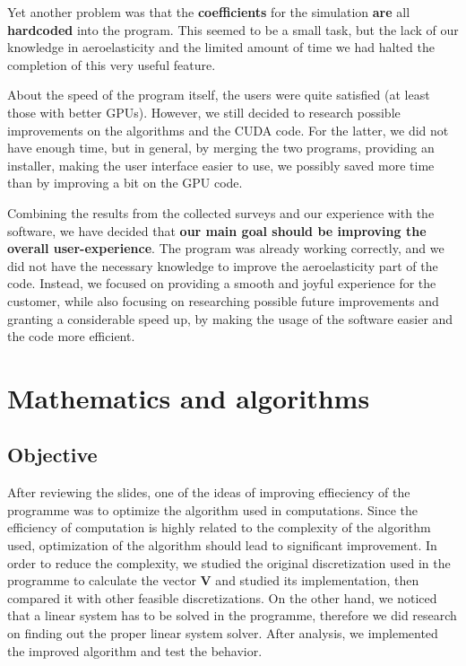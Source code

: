 \documentclass[a4paper, 11pt, article]{report}
\begin{document}
Yet another problem was that the \textbf{coefficients} for the simulation \textbf{are} all \textbf{hardcoded} into the program. This seemed to be a small task, but the lack of our knowledge in aeroelasticity and the limited amount of time we had halted the completion of this very useful feature.

About the speed of the program itself, the users were quite satisfied (at least those with better GPUs). However, we still decided to research possible improvements on the algorithms and the CUDA code. For the latter, we did not have enough time, but in general, by merging the two programs, providing an installer, making the user interface easier to use, we possibly saved more time than by improving a bit on the GPU code.

Combining the results from the collected surveys and our experience with the software, we have decided that \textbf{our main goal should be improving the overall user-experience}. The program was already working correctly, and we did not have the necessary knowledge to improve the aeroelasticity part of the code. Instead, we focused on providing a smooth and joyful experience for the customer, while also focusing on researching possible future improvements and granting a considerable speed up, by making the usage of the software easier and the code more efficient.

\section{Mathematics and algorithms}

\subsection{Objective}

After reviewing the slides, one of the ideas of improving effieciency of the programme was to optimize the algorithm used in computations. Since the efficiency of computation is highly related to the complexity of the algorithm used, optimization of the algorithm should lead to significant improvement. In order to reduce the complexity, we studied the original discretization used in the programme to calculate the vector \textbf{V} and studied its implementation, then compared it with other feasible discretizations. On the other hand, we noticed that a linear system has to be solved in the programme, therefore we did research on finding out the proper linear system solver. After analysis, we implemented the improved algorithm and test the behavior.
\end{document}
